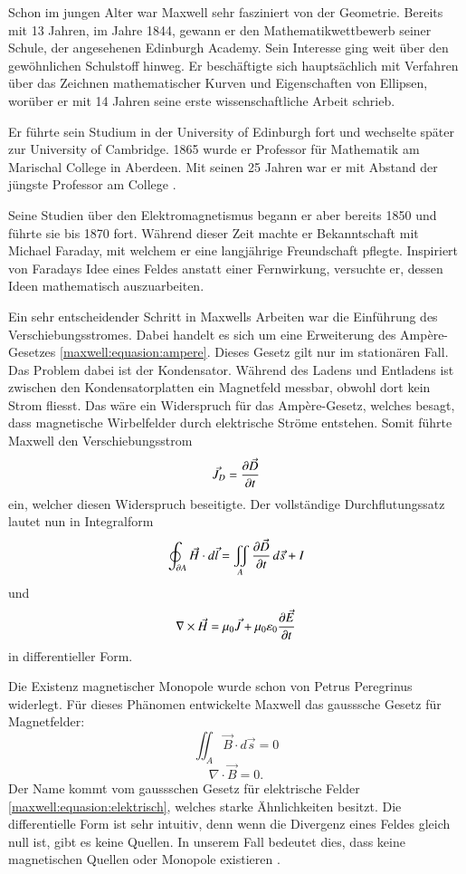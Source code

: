 Schon im jungen Alter war Maxwell sehr fasziniert von der Geometrie. Bereits mit 13 Jahren, im Jahre 1844, gewann er den Mathematikwettbewerb seiner Schule, der angesehenen Edinburgh Academy.
Sein Interesse ging weit über den gewöhnlichen Schulstoff hinweg.
Er beschäftigte sich hauptsächlich mit Verfahren über das Zeichnen mathematischer Kurven und Eigenschaften von Ellipsen, worüber er mit 14 Jahren seine erste wissenschaftliche Arbeit schrieb.

Er führte sein Studium in der University of Edinburgh fort und wechselte später zur University of Cambridge.
1865 wurde er Professor für Mathematik am Marischal College in Aberdeen.
Mit seinen 25 Jahren war er mit Abstand der jüngste Professor am College \cite{maxwell:maxwell}.

Seine Studien über den Elektromagnetismus begann er aber bereits 1850 und führte sie bis 1870 fort. 
Während dieser Zeit machte er Bekanntschaft mit Michael Faraday, mit welchem er eine langjährige Freundschaft pflegte.
Inspiriert von Faradays Idee eines Feldes anstatt einer Fernwirkung, versuchte er, dessen Ideen mathematisch auszuarbeiten.

Ein sehr entscheidender Schritt in Maxwells Arbeiten war die Einführung des Verschiebungsstromes.
Dabei handelt es sich um eine Erweiterung des Ampère-Gesetzes \eqref{maxwell:equasion:ampere}.
Dieses Gesetz gilt nur im stationären Fall.
Das Problem dabei ist der Kondensator.
Während des Ladens und Entladens ist zwischen den Kondensatorplatten ein Magnetfeld messbar, obwohl dort kein Strom fliesst.
Das wäre ein Widerspruch für das Ampère-Gesetz, welches besagt, dass magnetische Wirbelfelder durch elektrische Ströme entstehen.
Somit führte Maxwell den Verschiebungsstrom
\[
\vec{J}_D = \frac{\d \vec{D}}{\d t}
\]
ein, welcher diesen Widerspruch beseitigte.
Der vollständige Durchflutungssatz lautet nun in Integralform
\[
\oint_{\d A}
\vec{H}
\cdot
d\vec{l}
=
\iint_{A}
\frac{\d \vec{D}}{\d t} 
\,
d\vec{s}
+
I
\]
und 
\[
\nabla
\times
\vec{H}
=
\mu_0 \vec{J}
+
\mu_0 \varepsilon_0 \frac{\d \vec{E}}{\d t}
\]
in differentieller Form.

Die Existenz magnetischer Monopole wurde schon von Petrus Peregrinus widerlegt.
Für dieses Phänomen entwickelte Maxwell das gausssche Gesetz für Magnetfelder:
\[
\iint_{A}
\vec{B} \cdot d\vec{s}
=
0
\]
\[
\nabla \cdot \vec{B} = 0 .
\]
Der Name kommt vom gaussschen Gesetz für elektrische Felder \eqref{maxwell:equasion:elektrisch}, welches starke Ähnlichkeiten besitzt.
Die differentielle Form ist sehr intuitiv, denn wenn die Divergenz eines Feldes gleich null ist, gibt es keine Quellen. 
In unserem Fall bedeutet dies, dass keine magnetischen Quellen oder Monopole existieren \cite{maxwell:equasions}.

